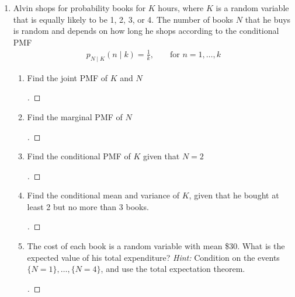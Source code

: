 \documentclass[paper=usletter, fontsize=12pt]{article}
\begin{document}
\begin{enumerate}[label=\textbf{\arabic*}.]
        \item
        Alvin shops for probability books for $K$ hours, where $K$ is a random
        variable that is equally likely to be 1, 2, 3, or 4. The number of
        books $N$ that he buys is random and depends on how long he shops
        according to the conditional PMF
        \begin{align*}
            p_{N \mid K}(n \mid k) = \frac{1}{k}, && \text{ for } n=1,\ldots,k
        \end{align*}
        \begin{enumerate}[label=(\alph*)]

            \item Find the joint PMF of $K$ and $N$
            \begin{proof}[\unskip\nopunct]
            \end{proof}
            \vspace{0.2in}

            \item Find the marginal PMF of $N$
            \begin{proof}[\unskip\nopunct]
            \end{proof}
            \vspace{0.2in}

            \item Find the conditional PMF of $K$ given that $N=2$
            \begin{proof}[\unskip\nopunct]
            \end{proof}
            \vspace{0.2in}

            \item Find the conditional mean and variance of $K$, given that he
            bought at least 2 but no more than 3 books.
            \begin{proof}[\unskip\nopunct]
            \end{proof}
            \vspace{0.2in}

            \item The cost of each book is a random variable with mean \$30.
            What is the expected value of his total expenditure? \textit{Hint:}
            Condition on the events $\{N=1\},\ldots, \{N=4\}$, and use the
            total expectation theorem.
            \begin{proof}[\unskip\nopunct]
            \end{proof}
            \vspace{0.2in}

        \end{enumerate}

    \end{enumerate}
\end{document}
